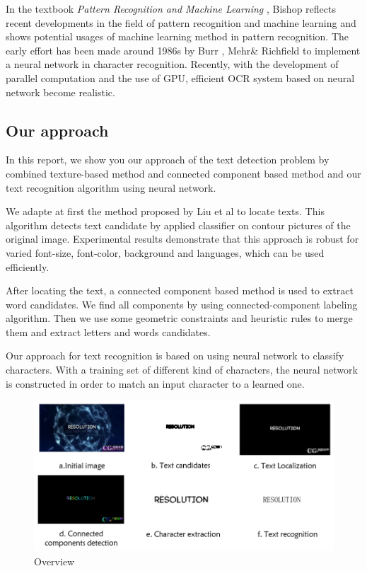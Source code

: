 \documentclass[paper=a4, french, 11pt]{scrartcl}
\begin{document}
In the textbook \textit{Pattern Recognition and Machine Learning} \cite{anzai2012pattern}, Bishop reflects recent developments in the field of pattern recognition and machine learning and shows potential usages of machine learning method in pattern recognition. The early effort has been made around 1986s by Burr \cite{burr1988experiments}, Mehr\& Richfield \cite{rajavelu1989neural} to implement a neural network in character recognition. Recently, with the development of parallel computation and the use of GPU, efficient OCR system based on neural network become realistic. 

\subsection{Our approach} \mbox{} \vspace{-0.5cm}

In this report, we show you our approach of the text detection problem by combined texture-based method and connected component based method and our text recognition algorithm using neural network. 

We adapte at first the method proposed by Liu et al \cite{liu2005text} to locate texts. This algorithm detects text candidate by applied classifier on contour pictures of the original image. Experimental results demonstrate that this approach is robust for varied font-size, font-color, background and languages, which can be used efficiently.

After locating the text, a connected component based method is used to extract word candidates. We find all components by using connected-component labeling algorithm. Then we use some geometric constraints and heuristic rules to merge them and extract letters and words candidates.  

Our approach for text recognition is based on using neural network to classify characters. With a training set of different kind of characters, the neural network is constructed in order to match an input character to a learned one. 


\begin{figure}[h]
\begin{center}
	\vspace{-1ex}
   \includegraphics[width=0.9\linewidth]{process.png}
\end{center}
\vspace{-4ex}
\caption{Overview}
\label{fig:heatmap}
\end{figure}
\end{document}
